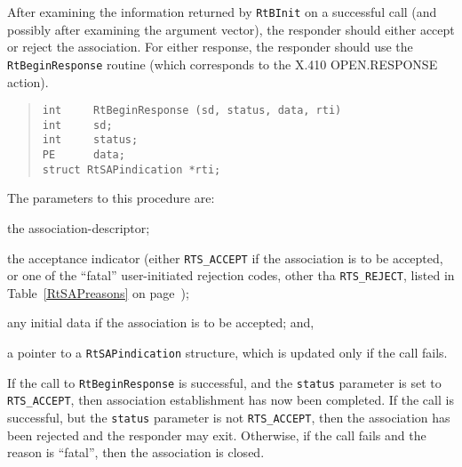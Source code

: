 After examining the information returned by \verb"RtBInit" on a successful call
(and possibly after examining the argument vector),
the responder should either accept or reject the association.
For either response,
the responder should use
the \verb"RtBeginResponse" routine
(which corresponds to the {\sf X.410 OPEN.RESPONSE\/} action).
\begin{quote}\small\begin{verbatim}
int     RtBeginResponse (sd, status, data, rti)
int     sd;
int     status;
PE      data;
struct RtSAPindication *rti;
\end{verbatim}\end{quote}
The parameters to this procedure are:
\begin{describe}
\item[\verb"sd":] the association-descriptor;

\item[\verb"status":] the acceptance indicator
(either \verb"RTS_ACCEPT" if the association is to be accepted,
or one of the ``fatal'' user-initiated rejection codes,
other tha \verb"RTS_REJECT",
listed in Table~\ref{RtSAPreasons} on page~\pageref{RtSAPreasons});

\item[\verb"data":] any initial data if the association is to be accepted;
and,

\item[\verb"rti":] a pointer to a \verb"RtSAPindication" structure, which is
updated only if the call fails.
\end{describe}
If the call to \verb"RtBeginResponse" is successful,
and the \verb"status" parameter is set to \verb"RTS_ACCEPT",
then association establishment has now been completed.
If the call is successful,
but the \verb"status" parameter is not \verb"RTS_ACCEPT",
then the association has been rejected and the responder may exit.
Otherwise,
if the call fails and the reason is ``fatal'',
then the association is closed.

